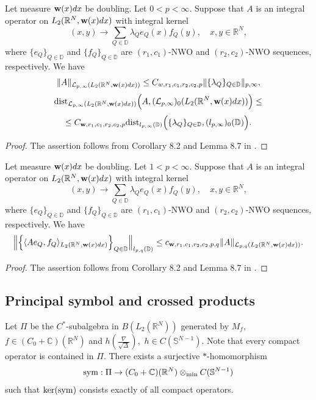 \documentclass{amsart}
\begin{document}
\begin{lemma}\label{NWO lemma} Let measure ${\bf w}(x)dx$ be doubling. Let $0<p<\infty.$  Suppose that $A$ is an integral operator on $L_2(\mathbb{R}^N,{\bf w}(x)dx)$ with integral kernel
$$(x,y)\to \sum_{Q\in\mathbb{D}}\lambda_Q e_Q(x)f_Q(y),\quad x,y\in\mathbb{R}^N,$$
where $\{e_Q\}_{Q\in\mathbb{D}}$ and $\{f_Q\}_{Q\in\mathbb{D}}$ are $(r_1,c_1)$-NWO and $(r_2,c_2)$-NWO sequences, respectively. We have
$$\|A\|_{\mathcal{L}_{p,\infty}(L_2(\mathbb{R}^N,{\bf w}(x)dx))}\leq C_{w,r_1,c_1,r_2,c_2,p} \|\{\lambda_Q\}_{Q\in\mathbb{D}}\|_{p,\infty},$$
$${\rm dist}_{\mathcal{L}_{p,\infty}(L_2(\mathbb{R}^N,{\bf w}(x)dx))}\Big(A,(\mathcal{L}_{p,\infty})_0(L_2(\mathbb{R}^N,{\bf w}(x)dx))\Big)\leq $$
$$\leq C_{{\bf w},r_1,c_1,r_2,c_2,p}{\rm dist}_{l_{p,\infty}(\mathbb{D})}\Big(\{\lambda_Q\}_{Q\in\mathbb{D}},(l_{p,\infty})_0(\mathbb{D})\Big).$$
\end{lemma}
\begin{proof} The assertion follows from Corollary 8.2 and Lemma 8.7 in \cite{HKarxiv}.
\end{proof}

\begin{lemma}\label{NWO lower estimate} Let measure ${\bf w}(x)dx$ be doubling. Let $1<p<\infty.$ Suppose that $A$ is an integral operator on $L_2(\mathbb{R}^N,{\bf w}(x)dx)$ with integral kernel
$$(x,y)\to \sum_{Q\in\mathbb{D}}\lambda_Q e_Q(x)f_Q(y),\quad x,y\in\mathbb{R}^N,$$
where $\{e_Q\}_{Q\in\mathbb{D}}$ and $\{f_Q\}_{Q\in\mathbb{D}}$ are $(r_1,c_1)$-NWO and $(r_2,c_2)$-NWO sequences, respectively. We have
$$\Big\|\Big\{\langle A e_Q,f_Q \rangle_{L_2(\mathbb{R}^N,{\bf w}(x)dx)}\Big\}_{Q\in\mathbb{D}}\Big\|_{l_{p,q}(\mathbb{D})}\leq c_{{\bf w},r_1,c_1,r_2,c_2,p,q}\|A\|_{\mathcal{L}_{p,q}(L_2(\mathbb{R}^N,{\bf w}(x)dx))}.$$
\end{lemma}
\begin{proof} The assertion follows from Corollary 8.2 and Lemma 8.7 in \cite{HKarxiv}.
\end{proof}

\subsection{Principal symbol and crossed products}

Let $\Pi$ be the $C^{\ast}$-subalgebra in $B(L_2(\mathbb{R}^N))$ generated by $M_f,$ $f\in (C_0+\mathbb{C})(\mathbb{R}^N)$ and $h(\frac{\nabla}{\sqrt{\Delta}}),$ $h\in C(\mathbb{S}^{N-1}).$ Note that every compact operator is contained in $\Pi.$ There exists a surjective $\ast$-homomorphism
$${\rm sym}:\Pi\to(C_0+\mathbb{C})(\mathbb{R}^N)\otimes_{{\rm min}}C(\mathbb{S}^{N-1})$$
such that ${\rm ker}({\rm sym})$ consists exactly of all compact operators.
\end{document}
